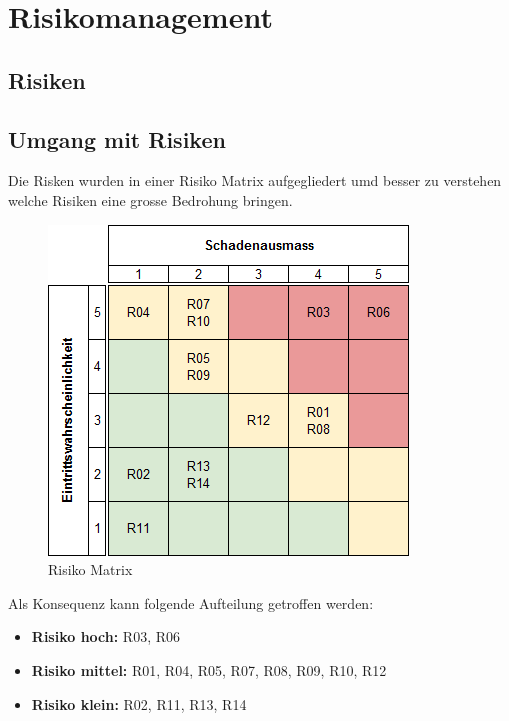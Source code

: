 \newpage

\section{Risikomanagement}
\subsection{Risiken}

\subsection{Umgang mit Risiken}
Die Risken wurden in einer Risiko Matrix aufgegliedert umd besser zu verstehen welche Risiken eine grosse Bedrohung bringen.

\begin{figure}[ht]
	\centering
	\includegraphics[scale=0.7]{images/risk_result.png}
	\caption{Risiko Matrix}
	\label{Risk result}
\end{figure}

Als Konsequenz kann folgende Aufteilung getroffen werden:
\begin{itemize}
	\item{\textbf{Risiko hoch: } R03, R06}
	\item{\textbf{Risiko mittel:} R01, R04, R05, R07, R08, R09, R10, R12 }
	\item{\textbf{Risiko klein:} R02, R11, R13, R14}
\end{itemize}
